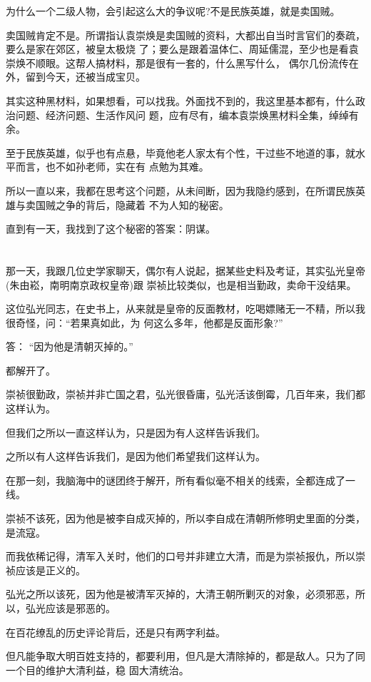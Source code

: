 \documentclass[11pt,a4paper,onecolumn]{article}
\begin{document}
为什么一个二级人物，会引起这么大的争议呢?不是民族英雄，就是卖国贼。

卖国贼肯定不是。所谓指认袁崇焕是卖国贼的资料，大都出自当时言官们的奏疏，要么是家在郊区，被皇太极烧
了；要么是跟着温体仁、周延儒混，至少也是看袁崇焕不顺眼。这帮人搞材料，那是很有一套的，什么黑写什么，
偶尔几份流传在外，留到今天，还被当成宝贝。

其实这种黑材料，如果想看，可以找我。外面找不到的，我这里基本都有，什么政治问题、经济问题、生活作风问
题，应有尽有，编本袁崇焕黑材料全集，绰绰有余。

至于民族英雄，似乎也有点悬，毕竟他老人家太有个性，干过些不地道的事，就水平而言，也不如孙老师，实在有
点勉为其难。

所以一直以来，我都在思考这个问题，从未间断，因为我隐约感到，在所谓民族英雄与卖国贼之争的背后，隐藏着
不为人知的秘密。

直到有一天，我找到了这个秘密的答案：阴谋。

\section[\thesection]{}

那一天，我跟几位史学家聊天，偶尔有人说起，据某些史料及考证，其实弘光皇帝(朱由崧，南明南京政权皇帝)跟
崇祯比较类似，也是相当勤政，卖命干没结果。

这位弘光同志，在史书上，从来就是皇帝的反面教材，吃喝嫖赌无一不精，所以我很奇怪，问：``若果真如此，为
何这么多年，他都是反面形象?''

答： ``因为他是清朝灭掉的。''

都解开了。

崇祯很勤政，崇祯并非亡国之君，弘光很昏庸，弘光活该倒霉，几百年来，我们都这样认为。

但我们之所以一直这样认为，只是因为有人这样告诉我们。

之所以有人这样告诉我们，是因为他们希望我们这样认为。

在那一刻，我脑海中的谜团终于解开，所有看似毫不相关的线索，全都连成了一线。

崇祯不该死，因为他是被李自成灭掉的，所以李自成在清朝所修明史里面的分类，是流寇。

而我依稀记得，清军入关时，他们的口号并非建立大清，而是为崇祯报仇，所以崇祯应该是正义的。

弘光之所以该死，因为他是被清军灭掉的，大清王朝所剿灭的对象，必须邪恶，所以，弘光应该是邪恶的。

在百花缭乱的历史评论背后，还是只有两字\myrule 利益。

但凡能争取大明百姓支持的，都要利用，但凡是大清除掉的，都是敌人。只为了同一个目的\myrule 维护大清利益，稳
固大清统治。
\end{document}
